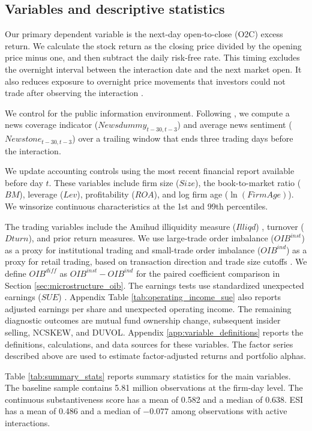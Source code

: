 \documentclass[12pt]{article}
\begin{document}
\subsection{Variables and descriptive statistics}

Our primary dependent variable is the next-day open-to-close (O2C) excess return. We calculate the stock return as the closing price divided by the opening price minus one, and then subtract the daily risk-free rate. This timing excludes the overnight interval between the interaction date and the next market open. It also reduces exposure to overnight price movements that investors could not trade after observing the interaction \citep{aboody2018,lopez2023chatgpt}.

We control for the public information environment. Following \citet{chen2014}, we compute a news coverage indicator ($Newsdummy_{t-30,t-3}$) and average news sentiment ($Newstone_{t-30,t-3}$) over a trailing window that ends three trading days before the interaction.

We update accounting controls using the most recent financial report available before day $t$. These variables include firm size ($Size$), the book-to-market ratio ($BM$), leverage ($Lev$), profitability ($ROA$), and log firm age ($\ln(\textit{FirmAge})$). We winsorize continuous characteristics at the 1st and 99th percentiles.

The trading variables include the Amihud illiquidity measure ($Illiqd$) \citep{amihud2002illiquidity}, turnover ($Dturn$), and prior return measures. We use large-trade order imbalance ($OIB^{inst}$) as a proxy for institutional trading and small-trade order imbalance ($OIB^{ind}$) as a proxy for retail trading, based on transaction direction and trade size cutoffs \citep{lee1992,lee1991inferring,tong2013}. We define $OIB^{diff}$ as $OIB^{inst}-OIB^{ind}$ for the paired coefficient comparison in Section \ref{sec:microstructure_oib}. The earnings tests use standardized unexpected earnings ($SUE$) \citep{bernard1989post}. Appendix Table \ref{tab:operating_income_sue} also reports adjusted earnings per share and unexpected operating income. The remaining diagnostic outcomes are mutual fund ownership change, subsequent insider selling, NCSKEW, and DUVOL. Appendix \ref{app:variable_definitions} reports the definitions, calculations, and data sources for these variables. The factor series described above are used to estimate factor-adjusted returns and portfolio alphas.

Table \ref{tab:summary_stats} reports summary statistics for the main variables. The baseline sample contains 5.81 million observations at the firm-day level. The continuous substantiveness score has a mean of 0.582 and a median of 0.638. ESI has a mean of 0.486 and a median of $-0.077$ among observations with active interactions.
\end{document}
